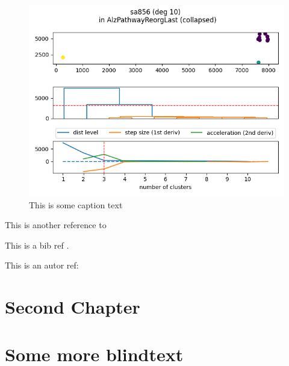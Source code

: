 \documentclass[
	fontsize=10pt, %
	twoside=false, %
	secnumdepth=1, %
]{kaobook}
\begin{document}
\begin{figure}[h]
  \centering
  \includegraphics{dummy.png}
  \caption{This is some caption text}
  \label{fig:some-figure}
\end{figure}

This is another reference to 

This is a bib ref \cite{duvenaud_convolutional_2015}.

This is an autor ref: \citeauthor{duvenaud_convolutional_2015} 



\chapter{Second Chapter}

\blindtext

\appendix %


\chapter{Some more blindtext}

\blindtext


\backmatter %
\end{document}
